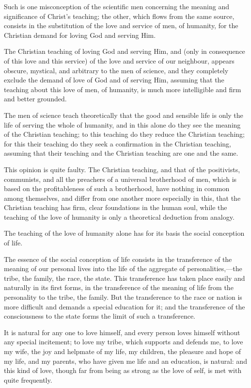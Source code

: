 \documentclass{book}
\begin{document}
Such is one misconception of the scientific men concerning the meaning and significance of Christ’s teaching; the other, which flows from the same source, consists in the substitution of the love and service of men, of humanity, for the Christian demand for loving God and serving Him.

The Christian teaching of loving God and serving Him, and (only in consequence of this love and this service) of the love and service of our neighbour, appears obscure, mystical, and arbitrary to the men of science, and they completely exclude the demand of love of God and of serving Him, assuming that the teaching about this love of men, of humanity, is much more intelligible and firm and better grounded.

The men of science teach theoretically that the good and sensible life is only the life of serving the whole of humanity, and in this alone do they see the meaning of the Christian teaching; to this teaching do they reduce the Christian teaching; for this their teaching do they seek a confirmation in the Christian teaching, assuming that their teaching and the Christian teaching are one and the same.

This opinion is quite faulty. The Christian teaching, and that of the positivists, communists, and all the preachers of a universal brotherhood of men, which is based on the profitableness of such a brotherhood, have nothing in common among themselves, and differ from one another more especially in this, that the Christian teaching has firm, clear foundations in the human soul, while the teaching of the love of humanity is only a theoretical deduction from analogy.

The teaching of the love of humanity alone has for its basis the social conception of life.

The essence of the social conception of life consists in the transference of the meaning of our personal lives into the life of the aggregate of personalities,—the tribe, the family, the race, the state. This transference has taken place easily and naturally in its first forms, in the transference of the meaning of life from the personality to the tribe, the family. But the transference to the race or nation is more difficult and demands a special education for it; and the transference of the consciousness to the state forms the limit of such a transference.

It is natural for any one to love himself, and every person loves himself without any special incitement; to love my tribe, which supports and defends me, to love my wife, the joy and helpmate of my life, my children, the pleasure and hope of my life, and my parents, who have given me life and an education, is natural: and this kind of love, though far from being as strong as the love of self, is met with quite frequently.
\end{document}
